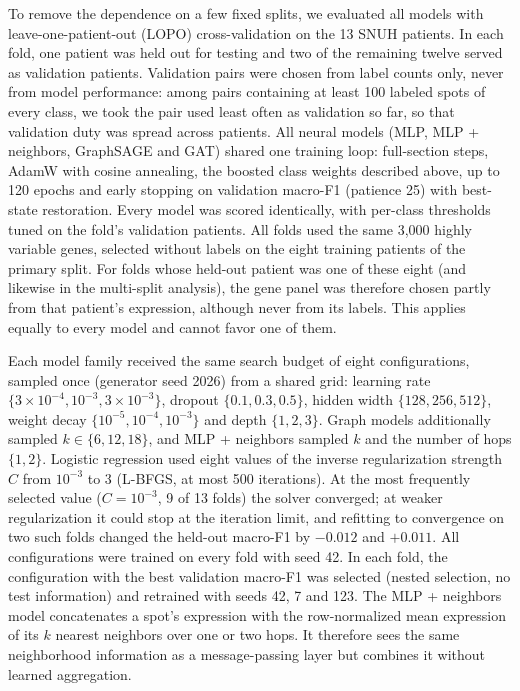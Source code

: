\documentclass[11pt,letterpaper]{article}
\begin{document}
To remove the dependence on a few fixed splits, we evaluated all models with leave-one-patient-out (LOPO) cross-validation on the 13 SNUH patients. In each fold, one patient was held out for testing and two of the remaining twelve served as validation patients. Validation pairs were chosen from label counts only, never from model performance: among pairs containing at least 100 labeled spots of every class, we took the pair used least often as validation so far, so that validation duty was spread across patients. All neural models (MLP, MLP + neighbors, GraphSAGE and GAT) shared one training loop: full-section steps, AdamW with cosine annealing, the boosted class weights described above, up to 120 epochs and early stopping on validation macro-F1 (patience 25) with best-state restoration. Every model was scored identically, with per-class thresholds tuned on the fold's validation patients. All folds used the same 3{,}000 highly variable genes, selected without labels on the eight training patients of the primary split. For folds whose held-out patient was one of these eight (and likewise in the multi-split analysis), the gene panel was therefore chosen partly from that patient's expression, although never from its labels. This applies equally to every model and cannot favor one of them.

Each model family received the same search budget of eight configurations, sampled once (generator seed 2026) from a shared grid: learning rate $\{3 \times 10^{-4}, 10^{-3}, 3 \times 10^{-3}\}$, dropout $\{0.1, 0.3, 0.5\}$, hidden width $\{128, 256, 512\}$, weight decay $\{10^{-5}, 10^{-4}, 10^{-3}\}$ and depth $\{1, 2, 3\}$. Graph models additionally sampled $k \in \{6, 12, 18\}$, and MLP + neighbors sampled $k$ and the number of hops $\{1, 2\}$. Logistic regression used eight values of the inverse regularization strength $C$ from $10^{-3}$ to 3 (L-BFGS, at most 500 iterations). At the most frequently selected value ($C = 10^{-3}$, 9 of 13 folds) the solver converged; at weaker regularization it could stop at the iteration limit, and refitting to convergence on two such folds changed the held-out macro-F1 by $-0.012$ and $+0.011$. All configurations were trained on every fold with seed 42. In each fold, the configuration with the best validation macro-F1 was selected (nested selection, no test information) and retrained with seeds 42, 7 and 123. The MLP + neighbors model concatenates a spot's expression with the row-normalized mean expression of its $k$ nearest neighbors over one or two hops. It therefore sees the same neighborhood information as a message-passing layer but combines it without learned aggregation.
\end{document}

